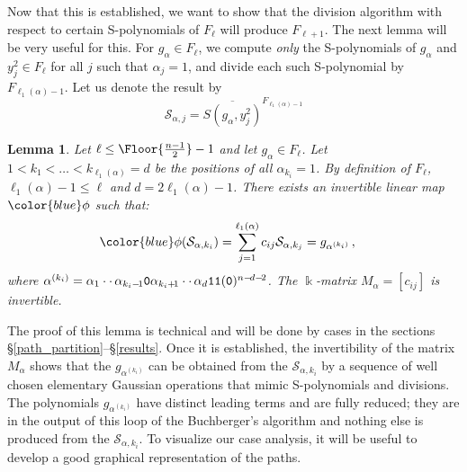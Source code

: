 \documentclass[10pt,a4paper]{article}
\newtheorem{lemma}{Lemma}[section]
\def\field{\Bbbk}
\DeclarePairedDelimiter\Floor\lfloor\rfloor
\begin{document}
Now that this is established, we want to  show that the division algorithm with respect to certain S-polynomials of $F_\ell$ will produce $F_{\ell+1}$.
The next lemma will be very useful for this.
For $g_\alpha\in F_\ell$, we compute {\sl only} the S-polynomials of $g_\alpha$ and $y_j^2\in F_\ell$ for all $j$ such that $\alpha_j=1$, and divide each such S-polynomial by $F_{\ell_1(\alpha)-1}$.
Let us denote the result by
	$$\mathcal{S}_{\alpha, {j}} = \overline{S(g_{\alpha}, y^{2}_{j})}^{F_{\ell_1(\alpha)-1}}$$
\begin{lemma}
	\label{lemma_phi_map} Let $\ell \le \Floor{\frac{n-1}{2}}-1$
	and let $g_\alpha\in F_\ell$.
	Let  $1<k_1 < \dots < k_{\ell_1(\alpha)}= d$ be the positions of all $\alpha_{k_i} = 1$. By definition of $F_\ell$, $\ell_1(\alpha)-1\le\ell$ and $d=2\ell_1(\alpha)-1$.
	There exists an invertible linear map $\color{blue} \phi$ such that:
	\vskip -18pt
	\begin{align*}
	    \textnormal{$\color{blue} \phi$}(\mathcal{S}_{\alpha, k_i}) = \sum_{j=1}^{\ell_1(\alpha)} c_{ij} \mathcal{S}_{\alpha, {k_{j}}} &= g_{\alpha^{(k_i)}}\,,
	\end{align*}
	where $\alpha^{(k_i)} = \alpha_1 \cdot\cdot\, \alpha_{k_{i}-\!1} \textnormal{\texttt{0}} \alpha_{k_{i}+\!1} \cdot\cdot\, \alpha_{d}  
	\textnormal{\texttt{11}} (\textnormal{\texttt{0}})^{n-\!d-\!2}$.
	The $\field$-matrix $M_\alpha=[c_{ij}]$ is invertible.
\end{lemma}

The proof of this lemma is technical and will be done by cases in the sections \S\ref{path_partition}--\S\ref{results}.
Once it is established, the invertibility of the matrix $M_\alpha$ shows that the $g_{\alpha^{(k_i)}}$ can be obtained from the $\mathcal{S}_{\alpha, k_i}$
by a sequence of well chosen elementary Gaussian operations that mimic S-polynomials and divisions. The polynomials $g_{\alpha^{(k_i)}}$ have distinct leading terms 
and are fully reduced; they are in the output of this loop of the Buchberger's algorithm and nothing else is produced from the $\mathcal{S}_{\alpha, k_i}$.
To visualize our case analysis, it will be useful to develop a good graphical representation of the paths.
\end{document}
